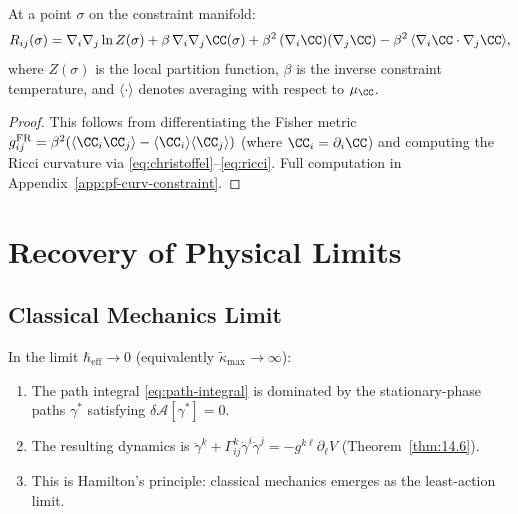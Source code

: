 \begin{theorem}\label{thm:14.11}
At a point $\sigma$ on the constraint manifold:
\begin{equation}\label{eq:curv-constraint}
  R_{ij}(\sigma) = \nabla_i \nabla_j \ln Z(\sigma)
  + \beta\,\nabla_i \nabla_j \CC(\sigma)
  + \beta^2\,(\nabla_i \CC)(\nabla_j \CC)
  - \beta^2\,\langle \nabla_i \CC \cdot \nabla_j \CC \rangle,
\end{equation}
where $Z(\sigma)$ is the local partition function, $\beta$ is the
inverse constraint temperature, and $\langle\cdot\rangle$ denotes
averaging with respect to $\mu_{\CC}$.
\end{theorem}

\begin{proof}
This follows from differentiating the Fisher metric
$g_{ij}^{\mathrm{FR}} = \beta^2(\langle \CC_i \CC_j \rangle -
\langle \CC_i \rangle \langle \CC_j \rangle)$ (where
$\CC_i = \partial_i \CC$) and computing the Ricci curvature via
\eqref{eq:christoffel}--\eqref{eq:ricci}.  Full computation in
Appendix~\ref{app:pf-curv-constraint}.
\end{proof}

\section{Recovery of Physical Limits}
\label{sec:ch14:limits}

\subsection{Classical Mechanics Limit}

\begin{theorem}\label{thm:14.12}
In the limit $\hbar_{\mathrm{eff}} \to 0$ (equivalently
$\tilde{\kappa}_{\max} \to \infty$):
\begin{enumerate}
  \item The path integral \eqref{eq:path-integral} is dominated by
        the stationary-phase paths $\gamma^*$ satisfying
        $\delta\mathcal{A}[\gamma^*] = 0$.
  \item The resulting dynamics is $\ddot\gamma^k +
        \Gamma^k_{ij}\dot\gamma^i\dot\gamma^j = -g^{k\ell}\partial_\ell V$
        (Theorem~\ref{thm:14.6}).
  \item This is Hamilton's principle: classical mechanics emerges as
        the least-action limit.
\end{enumerate}
\end{theorem}

